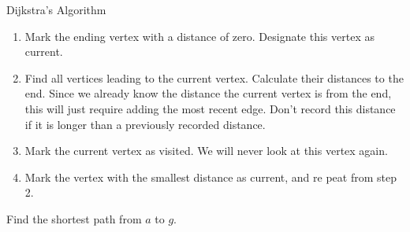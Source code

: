    \begin{frame}[fragile]{Dijkstra's Algorithm}
\begin{enumerate}
\item Mark the ending vertex with a distance of zero.  Designate this vertex as current.
\item Find all vertices leading to the current vertex.  Calculate their distances to the end.  
Since we already know the distance the current vertex is from the end, this will just 
require adding the most recent edge.  Don't record this distance if it is longer than a 
previously recorded distance.
\item Mark the current vertex as visited.  We will never look at this vertex again.
\item Mark the vertex with the smallest distance as current, and re
peat from step 2.
\end{enumerate}
\end{frame}

   \begin{frame}[fragile]
Find the shortest path from $a$ to $g$.



\end{frame}


